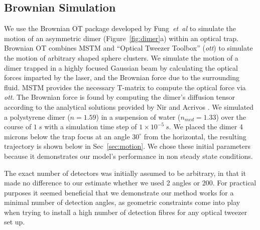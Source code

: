 \subsection{Brownian Simulation}
\label{sec:brownian}

We use the Brownian OT package developed by Fung~\textit{et~al} \cite{Vigilante2020Brownian_OT} to simulate the motion of an asymmetric dimer (Figure~\ref{fig:dimer}a) within an optical trap. Brownian OT combines MSTM \cite{Mishchenko1996MSTM} and ``Optical Tweezer Toolbox'' (\textit{ott}) \cite{Lenton2020} to simulate the motion of arbitrary
shaped sphere clusters. We simulate the motion of a dimer trapped in a highly focused Gaussian beam by calculating the optical forces imparted by the laser, and the Brownian force due to the surrounding fluid. MSTM provides the necessary T-matrix to compute the optical force via \textit{ott}. The Brownian force is found by computing the dimer's diffusion tensor according to the analytical solutions provided by Nir and Acrivos \cite{nir_acrivos_1973}. We simulated a polystyrene dimer ($n = 1.59$) in a suspension of water ($n_{med} = 1.33$) over the course of $1 \ s$ with a simulation time step of $1 \times 10^{-5} \ s$. We placed the dimer 4 microns below the trap focus at an angle $30^{\circ}$ from the horizontal, the resulting trajectory is shown below in Sec~\ref{sec:motion}. We chose these initial parameters because it demonstrates our model's performance in non steady state conditions. 

The exact number of detectors was initially assumed to be arbitrary, in that it made no difference to our estimate whether we used 2 angles or 200. For practical purposes it seemed beneficial that we demonstrate our method works for a minimal number of detection angles, as geometric constraints come into play when trying to install a high number of detection fibres for any optical tweezer set up. 


